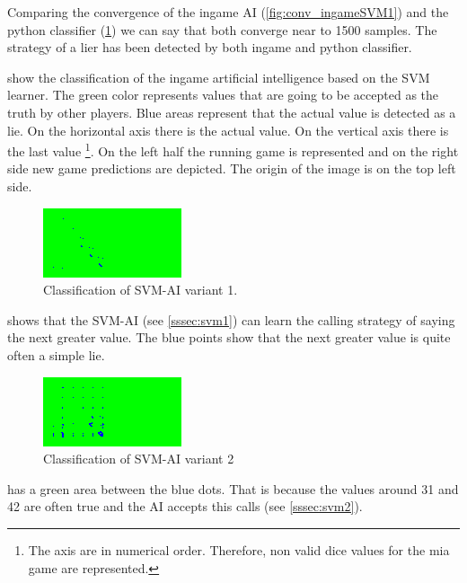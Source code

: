 \documentclass[11pt]{article}
\begin{document}
Comparing the convergence of the ingame AI (\cref{fig:conv_ingameSVM1}) and the python classifier (\cref{fig:svm1}) we can say that both converge near to 1500 samples. 
The strategy of a lier has been detected by both ingame and python classifier. 

 show the classification of the ingame artificial intelligence based on the SVM learner.
The green color represents values that are going to be accepted as the truth by other players. Blue areas represent that the actual value is detected as a lie.
On the horizontal axis there is the actual value. On the vertical axis there is the last value \footnote{The axis are in numerical order. Therefore, non valid dice values for the mia game are represented.}. 
On the left half the running game is represented and on the right side new game predictions are depicted. The origin of the image is on the top left side. 

\begin{figure}[H]
	\centering
	\includegraphics[width=.45\textwidth]{../testdata/svm1.png}
	\caption{Classification of SVM-AI variant 1.}
	\label{fig:svm1}
\end{figure}

 shows that the SVM-AI (see \cref{sssec:svm1}) can learn the calling strategy of saying the next greater value. The blue points show that the next greater value is quite often a simple lie.

\begin{figure}[H]
	\centering
	\includegraphics[width=.45\textwidth]{../testdata/svm2.png}
	\caption{Classification of SVM-AI variant 2}
	\label{fig:svm2}
\end{figure}

 has a green area between the blue dots. That is because the values around 31 and 42 are often true and the AI accepts this calls (see \cref{sssec:svm2}).
\end{document}

